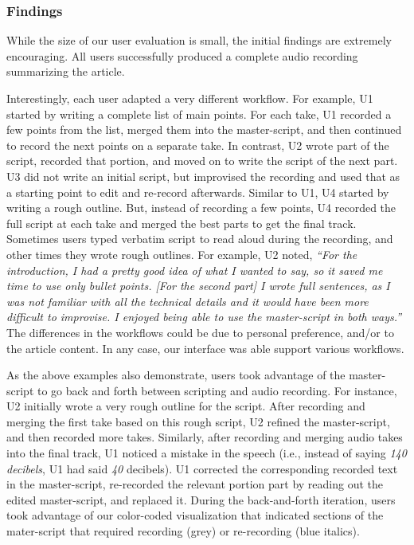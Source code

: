 \subsubsection{Findings}
While the size of our user evaluation is small, the initial findings are extremely encouraging. All users successfully produced a complete audio recording summarizing the article. %

\begin{mldescription}
 Interestingly, each user adapted a very different workflow. For example, U1 started by writing a complete list of main points. For each take, U1 recorded a few points from the list, merged them into the master-script, and then continued to record the next points on a separate take. In contrast, U2 wrote part of the script, recorded that portion, and moved on to write the script of the next part. U3 did not write an initial script, but improvised the recording and used that as a starting point to edit and re-record afterwards. Similar to U1, U4 started by writing a rough outline. But, instead of recording a few points, U4 recorded the full script at each take and merged the best parts to get the final track. Sometimes users typed verbatim script to read aloud during the recording, and other times they wrote rough outlines. For example, U2 noted,  \textit{``For
the introduction, I had a pretty good idea of what I wanted to
say, so it saved me time to use only bullet points. [For the
second part] I wrote full sentences, as I was not familiar with
all the technical details and it would have been more difficult
to improvise. I enjoyed being able to use the master-script in
both ways.''} The differences in the workflows could be due to personal preference, and/or  to the article content. In any case, our interface was able support various workflows. 

 As the above examples also demonstrate, users took advantage of the master-script to go back and forth between scripting and audio recording. For instance, U2 initially wrote a very rough outline for the script.
After recording and merging the first take based on this rough script, U2 refined the master-script, and then recorded more takes. Similarly, after recording and merging audio takes into the final track, U1 noticed a mistake in the speech
(i.e., instead of saying \textit{140 decibels}, U1 had said \textit{40}
decibels). U1 corrected the corresponding recorded text in the
master-script, re-recorded
the relevant portion part by reading out the edited master-script, and replaced it.
During the back-and-forth iteration, users took advantage of our color-coded visualization that indicated sections of the mater-script that required recording  (grey) or re-recording (blue italics). 


\end{mldescription}
